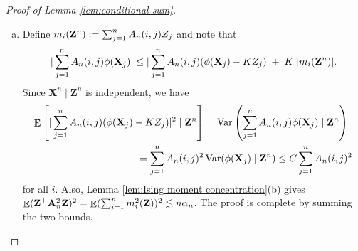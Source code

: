 \documentclass[10pt,a4paper]{amsart}
\DeclareMathOperator{\EE}{\mathbb{E}}
\DeclareMathOperator{\Var}{Var}
\DeclareMathOperator{\sumin}{\sum_{\mathnormal i=1}^{\mathnormal n}}
\DeclareMathOperator{\sumjn}{\sum_{\mathnormal j=1}^{\mathnormal n}}
\newcommand{\A}{\mathbf{A}}
\newcommand{\X}{\mathbf{X}}
\newcommand{\Z}{\mathbf{Z}}
\newcommand{\an}{\alpha_{\mathnormal n}}
\begin{document}
\begin{proof}[Proof of Lemma \ref{lem:conditional sum}]
    \begin{enumerate}[(a)]
    \item Define $m_i({\Z^n}) := \sumjn A_n(i,j) Z_j$
    and note that
    \begin{equation}
        |\sumjn A_n(i,j) \phi(\X_j)| \le |\sumjn A_n(i,j) (\phi(\X_j) - K Z_j)| + |K| |m_i({\Z^n})|.
    \end{equation}
    Since $\X^n \mid \Z^n$ is independent, we have
    \begin{align*}
        \EE \left[ |\sumjn A_n(i,j) (\phi(\X_j) - K Z_j)|^2 \mid \Z^n \right] & = \Var \left( \sumjn A_n(i,j) \phi(\X_j) \mid \Z^n \right) \\
        = \sumjn A_n(i,j)^2 &\Var( \phi(\X_j) \mid \Z^n ) \le C \sumjn A_n(i,j)^2
    \end{align*}
    for all $i$. Also, Lemma \ref{lem:Ising moment concentration}(b) gives $\EE (\Z^\top \A_n^2 \Z)^2 = \EE (\sumin m_i^2(\Z))^2 \lesssim n\an$.
    The proof is complete by summing the two bounds.
   

\end{enumerate}
\end{proof}
\end{document}
